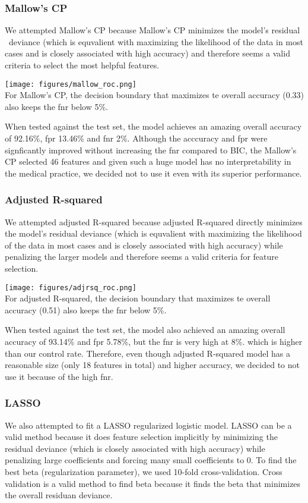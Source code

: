 \documentclass{article}
\begin{document}
\subsubsection{Mallow's CP}
We attempted Mallow's CP because Mallow's CP minimizes the model's residual \
deviance (which is equvalient with maximizing the likelihood of the data in most
cases and is closely associated with high accuracy) and therefore seems a valid
criteria to select the most helpful features.

\texttt{[image: figures/mallow\_roc.png]}\\

For Mallow's CP, the decision boundary that maximizes te overall accuracy (0.33)
also keeps the fnr below 5\%.

When tested against the test set, the model achieves an amazing overall accuracy
of 92.16\%, fpr 13.46\% and fnr 2\%. Although the acccuracy and fpr were
signficantly improved without increasing the fnr compared to BIC, the Mallow's CP
selected 46 features and given such a huge model has no interpretability in the
medical practice, we decided not to use it even with its superior performance.

\subsubsection{Adjusted R-squared}
We attempted adjusted R-squared because adjusted R-squared directly minimizes
the model's residual deviance (which is equvalient with maximizing the
likelihood of the data in most cases and is closely associated with high
accuracy) while penalizing the larger models and therefore seems a valid
criteria for feature selection.

\texttt{[image: figures/adjrsq\_roc.png]}\\

For adjusted R-squared, the decision boundary that maximizes te overall accuracy
(0.51) also keeps the fnr below 5\%.

When tested against the test set, the model also achieved an amazing overall
accuracy of 93.14\% and fpr 5.78\%, but the fnr is very high at 8\%. which is
higher than our control rate. Therefore, even though adjusted R-squared model
has a reasonable size (only 18 features in total) and higher accuracy, we
decided to not use it because of the high fnr.

\subsubsection{LASSO}
We also attempted to fit a LASSO regularized logistic model. LASSO can be a
valid method because it does feature selection implicitly by minimizing the
residual deviance (which is closely associated with high accuracy) while
penalizing large coefficients and forcing many small coefficients to 0. To find
the best beta (regularization parameter), we used 10-fold cross-validation.
Cross validation is a valid method to find beta because it finds the beta that
minimizes the overall residuan deviance.
\end{document}
